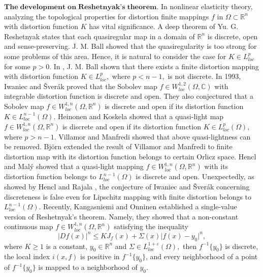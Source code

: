 \documentclass[11pt,twoside]{article}
\theoremstyle{definition}
\theoremstyle{remark}
\begin{document}
$\mathbf{The\;development \;on\;Reshetnyak’s\;theorem}.$ 
In nonlinear elasticity theory, analyzing the topological properties for distortion finite mappings $f$ in $\Omega\subset \mathbb{R}^{n}$ with distortion function $K$ has vital significance. A deep theorem of Yu. G. Reshetnyak \cite{Res89} states that each quasiregular map in a domain of $\mathbb{R}^{n}$ is discrete, open and sense-preserving. J. M. Ball \cite{Bal77,Bal81} showed that the quasiregularity is too strong for some problems of this area. Hence, it is natural to consider the case for $K\in L_{loc}^{p}$ for some $p>0.$ In \cite{Bal81}, J. M. Ball shown that there exists a finite distortion mapping with distortion function $K\in L_{loc}^{p},$ where 
$p<n-1,$  is not discrete. In 1993, Iwaniec and \v{S}ver\'{a}k \cite{IS93} proved that the Sobolev map $f\in W_{loc}^{1,2}(\Omega,\mathbb{C})$ with integrable distortion function is discrete and open. They also conjectured that  a Sobolev map $f\in W_{loc}^{1,n}(\Omega,\mathbb{R}^{n})$ is discrete and open if its distortion function $K\in L_{loc}^{n-1}(\Omega).$ Heinonen and Koskela \cite{HK93} showed that a quasi-light 
map $f\in W_{loc}^{1,n}(\Omega,\mathbb{R}^{n})$ is discrete and open if its distortion function $K\in L_{loc}^{p}(\Omega),$ where $p>n-1.$ 
Villamor and Manfredi \cite{VM98}  showed that above quasi-lightness can be removed.  Bj\"{o}rn \cite{Bjö} extended the result of Villamor and Manfredi \cite{VM98} to finite distortion map with its distortion function belongs to certain Orlicz space. Hencl and Mal\'{y} \cite{HM02} showed that a quasi-light mapping $f\in W_{loc}^{1,n}(\Omega,\mathbb{R}^{n})$ with its distortion function belongs to $L_{loc}^{n-1}(\Omega)$  is discrete and open. 
 Unexpectedly, as showed by Hencl and Rajala  \cite{HR13}, the conjecture of Iwaniec and \v{S}ver\'{a}k \cite{IS93} concerning discreteness is false even for Lipschitz mapping  with finite distortion belongs to $L_{loc}^{n-1}(\Omega).$  Recently, Kangasniemi and Onninen  \cite{KO222} established a single-value version of Reshetnyak's theorem. Namely, they showed that a non-constant continuous map $f\in W_{loc}^{1,n}(\Omega,\mathbb{R}^{n})$ satisfying the inequality
$$\vert Df(x)\vert^{n}\leq KJ_{f}(x)+\Sigma(x)\vert f(x)-y_{0}\vert^{n},$$
where $K\geq1$ is a constant, $y_{0}\in \mathbb{R}^{n}$ and $\Sigma\in L_{loc}^{1+\varepsilon}(\Omega),$ then $f^{-1}\{y_{0}\}$ is discrete, the local index $i(x,f)$ is positive in $f^{-1}\{y_{0}\}$, and every neighborhood of a point of $f^{-1}\{y_{0}\}$ is mapped to a neighborhood of $y_{0}.$ 
\end{document}
